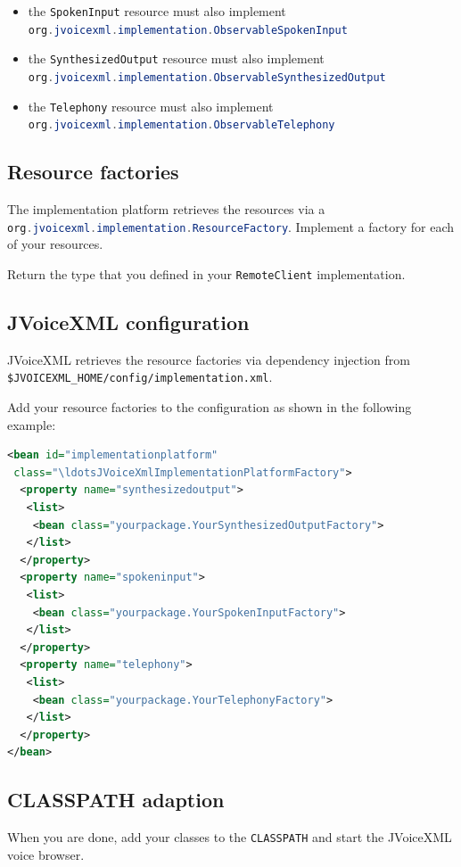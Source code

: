 \documentclass[11pt,a4paper]{article}
\begin{document}
\begin{itemize}
  \item the \lstinline[language=Java]{SpokenInput} resource must also implement
  \\
  \lstinline[language=Java]{org.jvoicexml.implementation.ObservableSpokenInput}
  \item the \lstinline[language=Java]{SynthesizedOutput} resource must also
  implement \\
  \lstinline[language=Java]{org.jvoicexml.implementation.ObservableSynthesizedOutput}
  \item the \lstinline[language=Java]{Telephony} resource must also implement \\
  \lstinline[language=Java]{org.jvoicexml.implementation.ObservableTelephony}
\end{itemize}

\subsection{Resource factories}

The implementation platform retrieves the resources via a
\lstinline[language=Java]{org.jvoicexml.implementation.ResourceFactory}.
Implement a factory for each of your resources.

Return the type that you defined in your
\lstinline[language=Java]{RemoteClient} implementation.

\subsection{JVoiceXML configuration}

JVoiceXML retrieves the resource factories via dependency injection from
\lstinline{$JVOICEXML_HOME/config/implementation.xml}.

Add your resource factories to the configuration as shown in the following
example:

\begin{lstlisting}[language=XML]
<bean id="implementationplatform"
 class="\ldotsJVoiceXmlImplementationPlatformFactory">
  <property name="synthesizedoutput">
   <list>
    <bean class="yourpackage.YourSynthesizedOutputFactory">
   </list>
  </property>
  <property name="spokeninput">
   <list>
    <bean class="yourpackage.YourSpokenInputFactory">
   </list>
  </property>
  <property name="telephony">
   <list>
    <bean class="yourpackage.YourTelephonyFactory">
   </list>
  </property>
</bean>
\end{lstlisting}

\subsection{CLASSPATH adaption}

When you are done, add your classes to the \lstinline{CLASSPATH} and start the
JVoiceXML voice browser.



\end{document}
